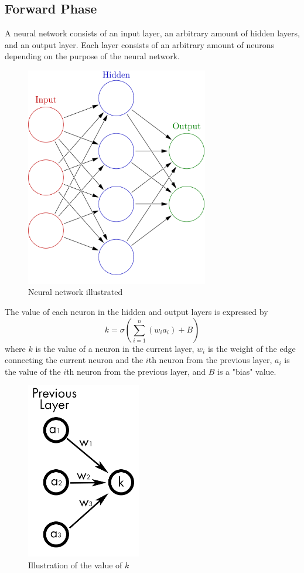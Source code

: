 \documentclass[a4paper, 11pt, english]{article}
\begin{document}
\subsection{Forward Phase}
\par A neural network consists of an input layer, an arbitrary amount of hidden layers, and an output layer. Each layer consists of an arbitrary amount of neurons depending on the purpose of the neural network.

\begin{figure}[H]
  \centering
  \includegraphics[width=8cm]{images/nn1.png}
  \caption{Neural network illustrated} %
  \label{fig:nn1}
\end{figure}

\par The value of each neuron in the hidden and output layers is expressed by
\[k = \sigma\left(\sum_{i=1}^{n}(w_ia_i) + B\right)\]
where $k$ is the value of a neuron in the current layer, $w_i$ is the weight of the edge connecting the current neuron and the $i$th neuron from the previous layer, $a_i$ is the value of the $i$th neuron from the previous layer, and $B$ is a "bias" value.

\begin{figure}[H]
  \centering
  \includegraphics[width=5cm]{images/nn2.png}
  \caption{Illustration of the value of $k$} %
  \label{fig:nn2}
\end{figure}
\end{document}
